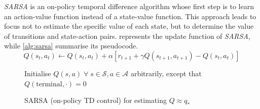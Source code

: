 \textit{SARSA} is an on-policy temporal difference algorithm whose first step is to learn an action-value function instead of a state-value function. This approach leads to focus not to estimate the specific value of each state, but to determine the value of transitions and state-action pairs.  represents the update function of \textit{SARSA}, while \vref{alg:sarsa} summarise its pseudocode.
\begin{equation}\label{eq:sarsa}
	Q(s_t, a_t) \leftarrow Q(s_t, a_t) + \alpha [r_{t+1} + \gamma Q(s_{t+1}, a_{t+1}) - Q(s_t, a_t)]
\end{equation}
\begin{figure}

	\begin{algorithm}[H]
		\SetAlgoLined
		\DontPrintSemicolon
		\LinesNumbered
		\KwIn{step size $\alpha \in (0,1]$, small $\epsilon > 0$\;}
		Initialise $Q(s,a) \; \forall\; s \in \mathcal{S}, a \in \mathcal{A}$ arbitrarily, except that $Q(\text{terminal}, \cdot) = 0$\;
		\caption{SARSA (on-policy TD control) for estimating $Q \approx q_*$}
		\label{alg:sarsa}
	\end{algorithm}
\end{figure}

